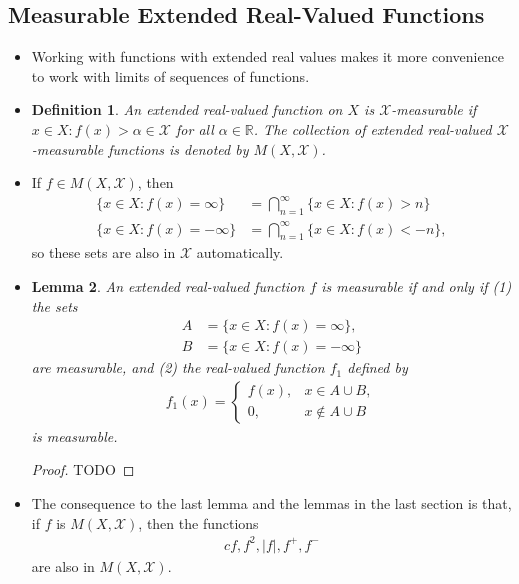 \documentclass[10pt]{article}
\newtheorem{lemma}{Lemma}
\newtheorem{definition}[lemma]{Definition}
\newcommand{\mcal}[1]{\mathcal{#1}}
\newcommand{\Real}{\mathbb{R}}
\begin{document}
\subsection{Measurable Extended Real-Valued Functions}

\begin{itemize}
  \item Working with functions with extended real values makes it more convenience to work with limits of sequences of functions.
  
  \item \begin{definition}
    An extended real-valued function on $X$ is $\mcal{X}$-measurable if ${x \in X: f(x) > \alpha} \in \mcal{X}$ for all $\alpha \in \Real$. The collection of extended real-valued $\mcal{X}$-measurable functions is denoted by $M(X,\mcal{X})$.
  \end{definition}

  \item If $f \in M(X,\mcal{X})$, then
  \begin{align*}
    \{x \in X : f(x) = \infty\} &= \bigcap_{n=1}^\infty \{ x \in X : f(x) > n\} \\
    \{x \in X : f(x) = -\infty\} &= \bigcap_{n=1}^\infty \{ x \in X : f(x) < -n\},
  \end{align*}
  so these sets are also in $\mcal{X}$ automatically.

  \item \begin{lemma}
    An extended real-valued function $f$ is measurable if and only if (1) the sets
    \begin{align*}
      A &= \{x \in X : f(x) = \infty\}, \\
      B &= \{x \in X : f(x) = -\infty\}
    \end{align*}
    are measurable, and (2) the real-valued function $f_1$ defined by
    \begin{align*}
      f_1(x) = \begin{cases}
        f(x), & x \in A \cup B, \\
        0, & x \not\in A \cup B
      \end{cases}
    \end{align*}
    is measurable.
  \end{lemma}

  \begin{proof}
    TODO
  \end{proof}

  \item The consequence to the last lemma and the lemmas in the last section is that, if $f$ is $M(X,\mcal{X})$, then the functions 
  \begin{align*}
    cf, f^2, |f|, f^{+}, f^{-}
  \end{align*}
  are also in $M(X,\mcal{X})$.


\end{itemize}
\end{document}
